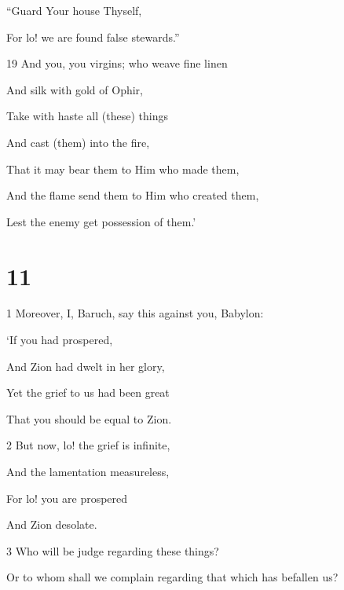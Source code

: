 \par “Guard Your house Thyself,

\par For lo! we are found false stewards.”

\par 19 And you, you virgins; who weave fine linen

\par And silk with gold of Ophir,

\par Take with haste all (these) things

\par And cast (them) into the fire,

\par That it may bear them to Him who made them,

\par And the flame send them to Him who created them,

\par Lest the enemy get possession of them.’

\chapter{11}

\par 1 Moreover, I, Baruch, say this against you, Babylon:

\par ‘If you had prospered,

\par And Zion had dwelt in her glory,

\par Yet the grief to us had been great

\par That you should be equal to Zion.

\par 2 But now, lo! the grief is infinite,

\par And the lamentation measureless,

\par For lo! you are prospered

\par And Zion desolate.

\par 3 Who will be judge regarding these things?

\par Or to whom shall we complain regarding that which has befallen us?

